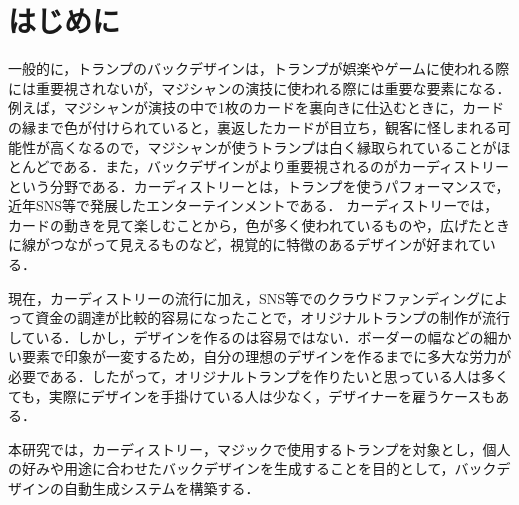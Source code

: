 \chapter{はじめに}
\label{0101}
一般的に，トランプのバックデザインは，トランプが娯楽やゲームに使われる際には重要視されないが，マジシャンの演技に使われる際には重要な要素になる．例えば，マジシャンが演技の中で1枚のカードを裏向きに仕込むときに，カードの縁まで色が付けられていると，裏返したカードが目立ち，観客に怪しまれる可能性が高くなるので，マジシャンが使うトランプは白く縁取られていることがほとんどである．また，バックデザインがより重要視されるのがカーディストリーという分野である．カーディストリーとは，トランプを使うパフォーマンスで，近年SNS等で発展したエンターテインメントである． カーディストリーでは，カードの動きを見て楽しむことから，色が多く使われているものや，広げたときに線がつながって見えるものなど，視覚的に特徴のあるデザインが好まれている．

現在，カーディストリーの流行に加え，SNS等でのクラウドファンディングによって資金の調達が比較的容易になったことで，オリジナルトランプの制作が流行している．しかし，デザインを作るのは容易ではない．ボーダーの幅などの細かい要素で印象が一変するため，自分の理想のデザインを作るまでに多大な労力が必要である．したがって，オリジナルトランプを作りたいと思っている人は多くても，実際にデザインを手掛けている人は少なく，デザイナーを雇うケースもある．

本研究では，カーディストリー，マジックで使用するトランプを対象とし，個人の好みや用途に合わせたバックデザインを生成することを目的として，バックデザインの自動生成システムを構築する．


